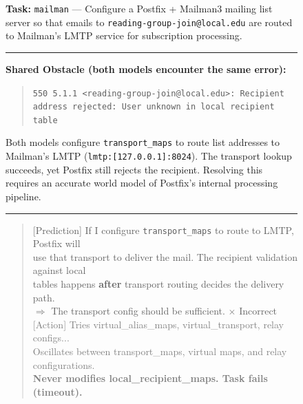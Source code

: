 \begin{figure}[t]
\centering
\small
\begin{tcolorbox}[
  colback=gray!3, colframe=black!50, boxrule=0.5pt,
  title={\textbf{Case Study: Accurate Environment Prediction Enables Action Refinement}},
  fonttitle=\bfseries\small, boxrule=0.5pt, arc=2pt
]

\textbf{Task:} \texttt{mailman} --- Configure a Postfix + Mailman3 mailing list server so that emails to \texttt{reading-group-join@local.edu} are routed to Mailman's LMTP service for subscription processing.

\vspace{4pt}
\hrule
\vspace{6pt}

\textbf{Shared Obstacle (both models encounter the same error):}

\vspace{2pt}
\begin{quote}
\ttfamily\scriptsize
\texttt{550 5.1.1 <reading-group-join@local.edu>: Recipient address rejected: User unknown in local recipient table}
\end{quote}

\vspace{2pt}
\noindent Both models configure \texttt{transport\_maps} to route list addresses to Mailman's LMTP (\texttt{lmtp:[127.0.0.1]:8024}). The transport lookup succeeds, yet Postfix still rejects the recipient. Resolving this requires an accurate world model of Postfix's internal processing pipeline.

\vspace{6pt}
\hrule
\vspace{6pt}

\begin{tcolorbox}[colback=casebefore!5!white, colframe=casebefore, boxrule=0.4pt, arc=1pt, title={\textbf{Before LWM RL}}, fonttitle=\small]

\begin{quote}
\ttfamily\scriptsize
\textcolor{blue!70!black}{[Prediction]} If I configure \texttt{transport\_maps} to route to LMTP, Postfix will\\
use that transport to deliver the mail. The recipient validation against local\\
tables happens \textbf{after} transport routing decides the delivery path.\\
$\Rightarrow$ The transport config should be sufficient. \textcolor{casebefore}{$\times$ Incorrect}\\[4pt]
\textcolor{gray}{[Action] Tries virtual\_alias\_maps, virtual\_transport, relay configs...}\\
\textcolor{gray}{Oscillates between transport\_maps, virtual maps, and relay configurations.}\\
\textcolor{gray}{\textbf{Never modifies local\_recipient\_maps. Task fails (timeout).}}
\end{quote}
\end{tcolorbox}


\end{tcolorbox}
\end{figure}
